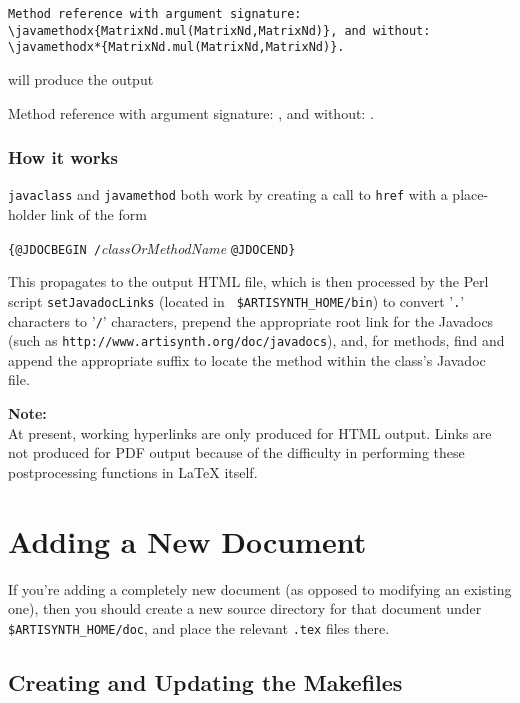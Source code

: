 \documentclass{article}
\begin{document}
\begin{lstlisting}[]
Method reference with argument signature:
\javamethodx{MatrixNd.mul(MatrixNd,MatrixNd)}, and without:
\javamethodx*{MatrixNd.mul(MatrixNd,MatrixNd)}.
\end{lstlisting}

will produce the output

Method reference with argument signature:
, and without:
.

\subsubsection{How it works}

{\tt \BKS javaclass} and {\tt \BKS javamethod} both work by creating a call
to {\tt \BKS href} with a place-holder link of the form

 {\tt \{@JDOCBEGIN /}{\it classOrMethodName} {\tt @JDOCEND\}}

This propagates to the output HTML file, which is then processed by
the Perl script {\tt setJavadocLinks} (located in {\tt
\$ARTISYNTH\_HOME/bin}) to convert '{\tt .}' characters to '{\tt /}'
characters, prepend the appropriate root link for the Javadocs (such
as {\tt http://www.\-artisynth.org/doc/javadocs}), and, for methods,
find and append the appropriate suffix to locate the method within the
class's Javadoc file.

\begin{sideblock}
{\bf Note:}\\
At present, working hyperlinks are only produced for HTML output.
Links are not produced for PDF output because of the difficulty
in performing these postprocessing functions in LaTeX itself.
\end{sideblock}

\section{Adding a New Document}

If you're adding a completely new document (as opposed
to modifying an existing one), then you should create a
new source directory for that document under {\tt \$ARTISYNTH\_HOME/doc},
and place the relevant {\tt .tex} files there.

\subsection{Creating and Updating the Makefiles}
\end{document}
